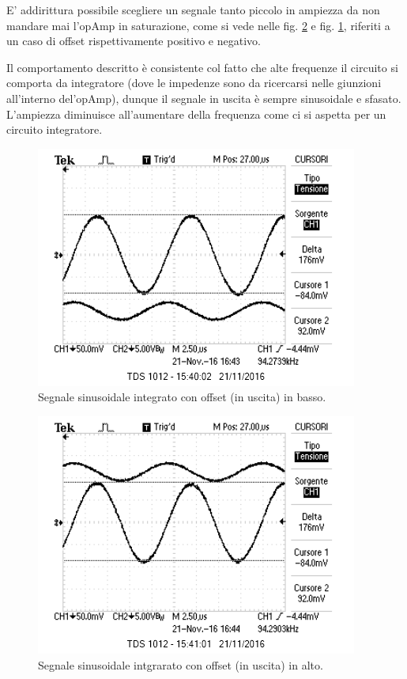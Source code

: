 \documentclass[10pt,a4paper]{article}
\begin{document}
E' addirittura possibile scegliere un segnale tanto piccolo in ampiezza da non mandare mai l'opAmp in saturazione, come si vede nelle fig. \ref{senoAlto} e fig. \ref{senoBasso}, riferiti a un caso di offset rispettivamente positivo e negativo.

Il comportamento descritto è consistente col fatto che alte frequenze il circuito si comporta da integratore (dove le impedenze sono da ricercarsi nelle giunzioni all'interno del'opAmp), dunque il segnale in uscita è sempre sinusoidale e sfasato. L'ampiezza diminuisce all'aumentare della frequenza come ci si aspetta per un circuito integratore. 

\begin{figure}[h]
\centering
\includegraphics[scale=1.0]{immagini/sinusoidaleinBasso.png}
\caption{Segnale sinusoidale integrato con offset (in uscita) in basso.}
\label{senoBasso}
\end{figure}


\begin{figure}[h]
\centering
\includegraphics[scale=1.0]{immagini/sinusoidaleinAlto.png}
\caption{Segnale sinusoidale intgrarato con offset (in uscita) in alto.}
\label{senoAlto}
\end{figure}
\end{document}
